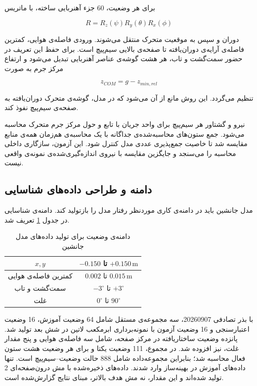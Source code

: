 برای هر وضعیت، 60 جزء آهنربایی ساخته، با ماتریس

\begin{equation}
	R=R_z(\psi)R_y(\theta)R_x(\phi)
\end{equation}

دوران و سپس به موقعیت متحرک منتقل می‌شوند. ورودی فاصله‌ی هوایی، کمترین فاصله‌ی آرایه‌ی دوران‌یافته تا صفحه‌ی بالایی سیم‌پیچ است. برای حفظ این تعریف در حضور سمت‌گشت و تاب، هر هشت گوشه‌ی عناصر آهنربایی تبدیل می‌شود و ارتفاع مرکز جرم به صورت

\begin{equation}
	z_{COM}=g-z_{min,rel}
	\label{eq:method-minimum-gap}
\end{equation}

تنظیم می‌گردد. این روش مانع از آن می‌شود که در مدل، گوشه‌ی متحرک دوران‌یافته به صفحه‌ی سیم‌پیچ نفوذ کند.

نیرو و گشتاور هر سیم‌پیچ برای واحد جریان با تابع  و حول مرکز جرم متحرک محاسبه می‌شود. جمع ستون‌های محاسبه‌شده‌ی جداگانه با یک محاسبه‌ی هم‌زمان همه‌ی منابع مقایسه شد تا خاصیت جمع‌پذیری عددی مدل کنترل شود. این آزمون، سازگاری داخلی محاسبه را می‌سنجد و جایگزین مقایسه با نیروی اندازه‌گیری‌شده‌ی نمونه‌ی واقعی نیست.

\subsection{دامنه و طراحی داده‌های شناسایی}

مدل جانشین باید در دامنه‌ی کاری موردنظر رفتار مدل  را بازتولید کند. دامنه‌ی شناسایی در جدول \ref{tab:method-identification-domain} تعریف شد.

\begin{table}[htbp]
	\centering
	\caption{دامنه‌ی وضعیت برای تولید داده‌های مدل جانشین}
	\label{tab:method-identification-domain}
	\begin{tabular}{|c|c|}
		\hline
		$x,y$ & $-0.150$ تا $+0.150\,\mathrm m$\\ \hline
		کمترین فاصله‌ی هوایی & $0.002$ تا $0.015\,\mathrm m$\\ \hline
		سمت‌گشت و تاب & $-3^\circ$ تا $+3^\circ$\\ \hline
		غلت & $0^\circ$ تا $90^\circ$\\ \hline
	\end{tabular}
\end{table}

با بذر تصادفی 20260907، سه مجموعه‌ی مستقل شامل 64 وضعیت آموزش، 16 وضعیت اعتبارسنجی و 16 وضعیت آزمون با نمونه‌برداری ابرمکعب لاتین در شش بعد تولید شد. پانزده وضعیت ساختاریافته در مرکز صفحه، شامل سه فاصله‌ی هوایی و پنج مقدار غلت، نیز افزوده شد. در مجموع، 111 وضعیت یکتا و برای هر وضعیت هشت ستون فعال محاسبه شد؛ بنابراین مجموعه‌داده شامل 888 حالت وضعیت--سیم‌پیچ است. تنها داده‌های آموزش در بهینه‌ساز وارد شدند. داده‌های ذخیره‌شده با مش درون‌صفحه‌ای 2 تولید شده‌اند و این مقدار، نه مش هدف بالاتر، مبنای نتایج گزارش‌شده است.

